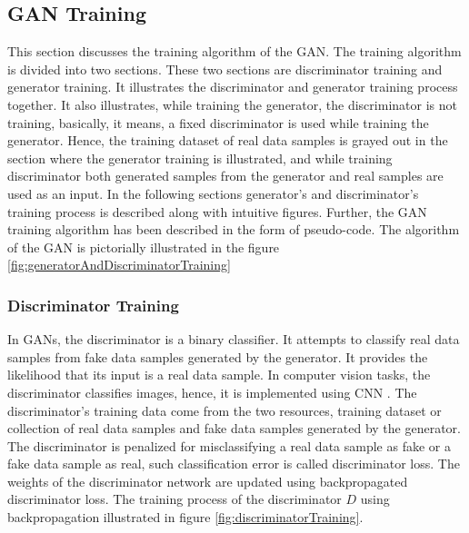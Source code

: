 \subsection{\ac{GAN} Training}


This section discusses the training algorithm of the \ac{GAN}. The training algorithm is divided into two sections. These two sections are discriminator training and generator training. It illustrates the discriminator and generator training process together. It also illustrates, while training the generator, the discriminator is not training, basically, it means, a fixed discriminator is used while training the generator. Hence, the training dataset of real data samples is grayed out in the section where the generator training is illustrated, and while training discriminator both generated samples from the generator and real samples are used as an input. In the following sections generator's and discriminator's training process is described along with intuitive figures. Further, the \ac{GAN} training algorithm has been described in the form of pseudo-code. The algorithm of the \ac{GAN} is pictorially illustrated in the figure \ref{fig:generatorAndDiscriminatorTraining}

\subsubsection{Discriminator Training}\label{TheDiscriminatorSubSection}

In \acp{GAN}, the discriminator is a binary classifier. It attempts to classify real data samples from fake data samples generated by the generator. It provides the likelihood that its input is a real data sample. In computer vision tasks, the discriminator classifies images, hence, it is implemented using \ac{CNN} \cite{radford2016unsupervised}. The discriminator's training data come from the two resources, training dataset or collection of real data samples and fake data samples generated by the generator. The discriminator is penalized for misclassifying a real data sample as fake or a fake data sample as real, such classification error is called discriminator loss. The weights of the discriminator network are updated using backpropagated discriminator loss. The training process of the discriminator $D$ using backpropagation illustrated in figure \ref{fig:discriminatorTraining}.

